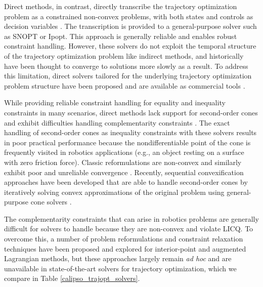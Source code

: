 Direct methods, in contrast, directly transcribe the trajectory optimization problem as a constrained non-convex problems, with both states and controls as decision variables \cite{stryk1993numerical}. The transcription is provided to a general-purpose solver such as SNOPT or Ipopt. This approach is generally reliable and enables robust constraint handling. However, these solvers do not exploit the temporal structure of the trajectory optimization problem like indirect methods, and historically have been thought to converge to solutions more slowly as a result. To address this limitation, direct solvers tailored for the underlying trajectory optimization problem structure have been proposed \cite{wang2009fast} and are available as commercial tools \cite{zanelli2020forces}. 

While providing reliable constraint handling for equality and inequality constraints in many scenarios, direct methods lack support for second-order cones \cite{boyd2004convex} and exhibit difficulties handling complementarity constraints \cite{scheel2000mathematical}. The exact handling of second-order cones as inequality constraints with these solvers results in poor practical performance because the nondifferentiable point of the cone is frequently visited in robotics applications (e.g., an object resting on a surface with zero friction force). Classic reformulations are non-convex and similarly exhibit poor and unreliable convergence \cite{vanderbei1998using}. Recently, sequential convexification approaches have been developed that are able to handle second-order cones by iteratively solving convex approximations of the original problem using general-purpose cone solvers \cite{szmuk2020successive,bonalli2019gusto}. 

The complementarity constraints that can arise in robotics problems are generally difficult for solvers to handle because they are non-convex and violate LICQ. To overcome this, a number of problem reformulations and constraint relaxation techniques have been proposed and explored for interior-point \cite{biegler2010nonlinear,raghunathan2003mathematical} and augmented Lagrangian \cite{izmailov2012global} methods, but these approaches largely remain \textit{ad hoc} and are unavailable in state-of-the-art solvers for trajectory optimization, which we compare in Table \ref{calipso_trajopt_solvers}.

